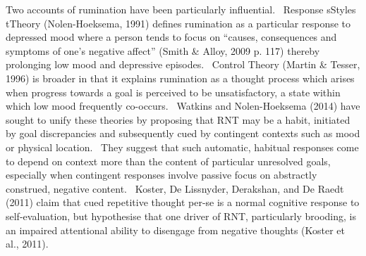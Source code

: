 \documentclass[man,a4paper]{apa6}
\begin{document}
Two accounts of rumination have been particularly influential. \ Response sStyles tTheory (Nolen-Hoeksema, 1991) defines rumination as a particular response to depressed mood where a person tends to focus on ``causes, consequences and symptoms of one's negative affect'' (Smith \& Alloy, 2009 p. 117) thereby prolonging low mood and depressive episodes. \ Control Theory (Martin \& Tesser, 1996) is broader in that it explains rumination as a thought process which arises when progress towards a goal is perceived to be unsatisfactory, a state within which low mood frequently co-occurs. \ Watkins and Nolen-Hoeksema (2014) have sought to unify these theories by proposing that RNT may be a habit, initiated by goal discrepancies and subsequently cued by contingent contexts such as mood or physical location. \ They suggest that such automatic, habitual responses come to depend on context more than the content of particular unresolved goals, especially when contingent responses involve passive focus on abstractly construed, negative content. \ Koster, De Lissnyder, Derakshan, and De Raedt (2011) claim that cued repetitive thought per-se is a normal cognitive response to self-evaluation, but hypothesise that one driver of RNT, particularly brooding, is an impaired attentional ability to disengage from negative thoughts (Koster et al., 2011).
\end{document}

